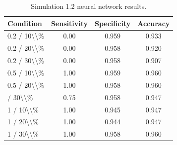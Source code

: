 \begin{table}[!h]
\centering
\caption{\label{tab:tab:sim12_nn}Simulation 1.2 neural network results.}
\centering
\begin{tabular}[t]{lccc}
\toprule
Condition & Sensitivity & Specificity & Accuracy\\
\midrule
0.2 / 10\textbackslash{}\textbackslash{}\% & 0.00 & 0.959 & 0.933\\
0.2 / 20\textbackslash{}\textbackslash{}\% & 0.00 & 0.958 & 0.920\\
0.2 / 30\textbackslash{}\textbackslash{}\% & 0.00 & 0.958 & 0.907\\
0.5 / 10\textbackslash{}\textbackslash{}\% & 1.00 & 0.959 & 0.960\\
0.5 / 20\textbackslash{}\textbackslash{}\% & 1.00 & 0.958 & 0.960\\
\addlinespace
0.5 / 30\textbackslash{}\textbackslash{}\% & 0.75 & 0.958 & 0.947\\
1 / 10\textbackslash{}\textbackslash{}\% & 1.00 & 0.945 & 0.947\\
1 / 20\textbackslash{}\textbackslash{}\% & 1.00 & 0.944 & 0.947\\
1 / 30\textbackslash{}\textbackslash{}\% & 1.00 & 0.958 & 0.960\\
\bottomrule
\end{tabular}
\end{table}
